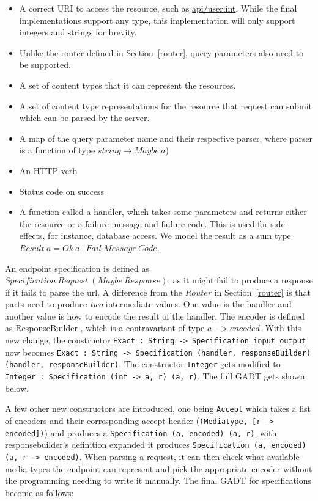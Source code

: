 \begin{itemize}
    \item A correct URI to access the resource, such as \url{api/user:int}.
        While the final implementations support any type, this implementation
        will only support integers and strings for brevity.
    \item Unlike the router defined in Section~\ref{router}, query parameters
        also need to be supported.
    \item A set of content types that it can represent the resources.
    \item A set of content type representations for the resource that request can
        submit which can be parsed by the server.
    \item A map of the query parameter name and their respective parser,
        where parser is a function of type $string \rightarrow Maybe\ a$)
    \item An HTTP verb
    \item Status code on success
    \item A function called a handler, which takes some parameters and returns
        either the resource or a failure message and failure code. This is used
        for side effects, for instance, database access. We model the result as
        a sum type $Result\ a = Ok\ a\ |\ Fail\ Message\ Code$.
\end{itemize}

An endpoint specification is defined as $Specification\ Request\ (Maybe\
Response)$, as it might fail to produce a response if it fails to parse the url.
A difference from the $Router$ in Section~\ref{router} is that parts need to
produce \textit{two} intermediate values.  One value is the handler and another
value is how to encode the result of the handler. The encoder is defined as
ResponseBuilder , which is a contravariant of type $a -> encoded$.  With this
new change, the constructor \texttt{Exact : String -> Specification input
output} now becomes \texttt{Exact : String -> Specification (handler,
responseBuilder) (handler, responseBuilder)}. The constructor \texttt{Integer}
gets modified to \texttt{Integer : Specification (int -> a, r) (a, r)}. The full
GADT gets shown below.

A few other new constructors are introduced, one being \texttt{Accept} which
takes a list of encoders and their corresponding accept header
(\texttt{(Mediatype, [r -> encoded])}) and produces a \texttt{Specification (a,
    encoded) (a, r)}, with responsebuilder's definition expanded it produces
    \texttt{Specification (a, encoded) (a, r -> encoded)}. When parsing a
    request, it can then check what available media types the endpoint can
    represent and pick the appropriate encoder without the programming needing
    to write it manually. The final GADT for specifications become as follows:

